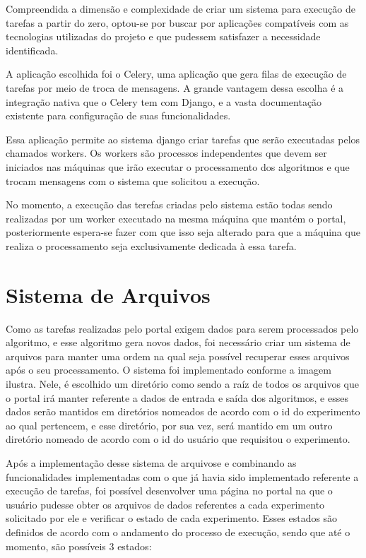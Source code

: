 \documentclass[tg]{mdtufsm}
\begin{document}
Compreendida a dimensão e complexidade de criar um sistema para execução de tarefas a partir do zero, optou-se por buscar por aplicações compatíveis com as tecnologias utilizadas do projeto e que pudessem satisfazer a necessidade identificada.

A aplicação escolhida foi o Celery, uma aplicação que gera filas de execução de tarefas por meio de troca de mensagens. A grande vantagem dessa escolha é a integração nativa que o Celery tem com Django, e a vasta documentação existente para configuração de suas funcionalidades.

Essa aplicação permite ao sistema django criar tarefas que serão executadas pelos chamados workers. Os workers são processos independentes que devem ser iniciados nas máquinas que irão executar o processamento dos algoritmos e que trocam mensagens com o sistema que solicitou a execução.

No momento, a execução das terefas criadas pelo sistema estão todas sendo realizadas por um worker executado na mesma máquina que mantém o portal, posteriormente espera-se fazer com que isso seja alterado para que a máquina que realiza o processamento seja exclusivamente dedicada à essa tarefa.


\section{Sistema de Arquivos}
Como as tarefas realizadas pelo portal exigem dados para serem processados pelo algoritmo, e esse algoritmo gera novos dados, foi necessário criar um sistema de arquivos para manter uma ordem na qual seja possível recuperar esses arquivos após o seu processamento.
O sistema foi implementado conforme a imagem ilustra. Nele, é escolhido um diretório como sendo a raíz de todos os arquivos que o portal irá manter referente a dados de entrada e saída dos algoritmos, e esses dados serão mantidos em diretórios nomeados de acordo com o id do experimento ao qual pertencem, e esse diretório, por sua vez, será mantido em um outro diretório nomeado de acordo com o id do usuário que requisitou o experimento.

Após a implementação desse sistema de arquivose e combinando as funcionalidades implementadas com o que já havia sido implementado referente a execução de tarefas, foi possível desenvolver uma página no portal na que o usuário pudesse obter os arquivos de dados referentes a cada experimento solicitado por ele e verificar o estado de cada experimento. Esses estados são definidos de acordo com o andamento do processo de execução, sendo que até o momento, são possíveis 3 estados: 
\end{document}
